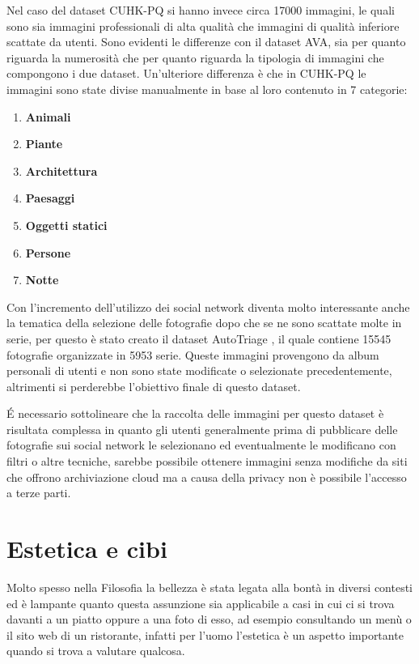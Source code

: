 Nel caso del dataset CUHK-PQ \cite{luo2011content} si hanno invece circa 17000 immagini, le quali sono sia immagini professionali di alta qualità che immagini di qualità inferiore scattate da utenti. Sono evidenti le differenze con il dataset AVA, sia per quanto riguarda la numerosità che per quanto riguarda la tipologia di immagini che compongono i due dataset. Un'ulteriore differenza è che in CUHK-PQ le immagini sono state divise manualmente in base al loro contenuto in 7 categorie:
\begin{enumerate}
\item \textbf{Animali}
\item \textbf{Piante}
\item \textbf{Architettura}
\item \textbf{Paesaggi}
\item \textbf{Oggetti statici}
\item \textbf{Persone}
\item \textbf{Notte}
\end{enumerate}

Con l'incremento dell'utilizzo dei social network diventa molto interessante anche la tematica della selezione delle fotografie dopo che se ne sono scattate molte in serie, per questo è stato creato il dataset AutoTriage \cite{chang2016automatic}, il quale contiene 15545 fotografie organizzate in 5953 serie. Queste immagini provengono da album personali di utenti e non sono state modificate o selezionate precedentemente, altrimenti si perderebbe l'obiettivo finale di questo dataset. 

É necessario sottolineare che la raccolta delle immagini per questo dataset è risultata complessa in quanto gli utenti generalmente prima di pubblicare delle fotografie sui social network le selezionano ed eventualmente le modificano con filtri o altre tecniche, sarebbe possibile ottenere immagini senza modifiche da siti che offrono archiviazione cloud ma a causa della privacy non è possibile l'accesso a terze parti.


\section{Estetica e cibi}

Molto spesso nella Filosofia la bellezza è stata legata alla bontà in diversi contesti ed è lampante quanto questa assunzione sia applicabile a casi in cui ci si trova davanti a un piatto oppure a una foto di esso, ad esempio consultando un menù o il sito web di un ristorante, infatti per l'uomo l'estetica è un aspetto importante quando si trova a valutare qualcosa.

